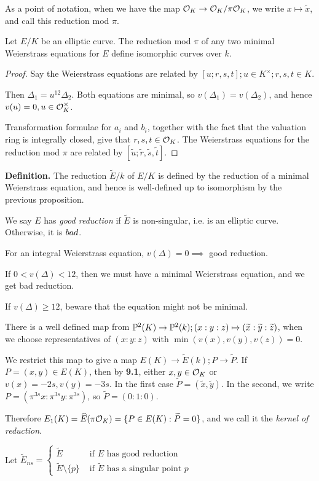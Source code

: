 \documentclass[10pt,a4paper]{article}
\begin{document}
As a point of notation, when we have the map $\O_K \to \O_K/\pi\O_K$, we write $x \mapsto \tilde{x}$, and call this reduction mod $\pi$.
\begin{proposition}
  Let $E/K$ be an elliptic curve. The reduction mod $\pi$ of any two minimal Weierstrass equations for $E$ define isomorphic curves over $k$.
\end{proposition}
\begin{proof}
  Say the Weierstrass equations are related by $[u; r,s,t]; u \in K^\times; r,s,t \in K$.

  Then $\Delta_1 = u^{12}\Delta_2$. Both equations are minimal, so $v(\Delta_1) = v(\Delta_2)$, and hence $v(u) = 0, u \in \O_K^\times$.

  Transformation formulae for $a_i$ and $b_i$, together with the fact that the valuation ring is integrally closed, give that $r, s, t \in \O_K$. The Weierstrass equations for the reduction mod $\pi$ are related by $[\tilde{u}; \tilde{r}, \tilde{s}, \tilde{t}]$.
\end{proof}
\textbf{Definition.} The reduction $\tilde{E}/k$ of $E/K$ is defined by the reduction of a minimal Weierstrass equation, and hence is well-defined up to isomorphism by the previous proposition.

We say $E$ has \emph{good reduction} if $\tilde{E}$ is non-singular, i.e. is an elliptic curve. Otherwise, it is $\emph{bad}$.

For an integral Weierstrass equation, $v(\Delta) = 0 \implies$ good reduction.

If $0 <v(\Delta) < 12$, then we must have a minimal Weierstrass equation, and we get bad reduction.

If $v(\Delta) \geq 12$, beware that the equation might not be minimal.

There is a well defined map from $\P^2(K) \to \P^2(k); (x:y:z)\mapsto (\tilde{x}:\tilde{y}:\tilde{z})$, when we choose representatives of $(x:y:z)$ with $\min(v(x),v(y),v(z)) = 0$.

We restrict this map to give a map $E(K) \to \tilde{E}(k); P \to \tilde{P}$. If $P=(x,y) \in E(K)$, then by \textbf{9.1}, either $x,y \in \O_K$ or $v(x) = -2s, v(y) = -3s$. In the first case $\tilde{P} = (\tilde{x}, \tilde{y})$. In the second, we write $P = (\pi^{3s}x:\pi^{3s}y :\pi^{3s})$, so $\tilde{P} = (0:1:0)$.

Therefore $E_1(K) = \hat{E}(\pi\O_K) = \{P \in E(K) : \tilde{P} = 0\}$, and we call it the \emph{kernel of reduction}.

Let $\tilde{E}_{ns} = \begin{cases} \tilde{E} &\text{ if $E$ has good reduction} \\ \tilde{E}\setminus\{p\} & \text{ if $\tilde{E}$ has a singular point $p$}\end{cases}$
\end{document}
